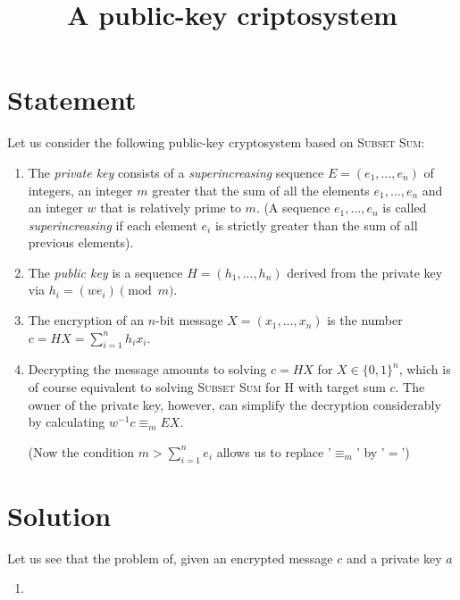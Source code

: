 \documentclass[a4paper]{article}
\title{A public-key criptosystem}
\begin{document}
\maketitle
\section*{Statement}
Let us consider the following public-key cryptosystem based on \textsc{Subset Sum}:

\begin{enumerate}[label=\alph*)]
	\item The \emph{private key} consists of a \emph{superincreasing} sequence $E = (e_1, ..., e_n)$ of integers, an integer $m$ greater that the sum of all the elements $e_1, ..., e_n$ and an integer $w$ that is relatively prime to $m$. (A sequence $e_1, ..., e_n$ is called \emph{superincreasing} if each element $e_i$ is strictly greater than the sum of all previous elements).
	\item The \emph{public key} is a sequence $H = (h_1, ..., h_n)$ derived from the private key via $h_i = (we_i) \pmod{m}$.
	\item The encryption of an $n$-bit message $X = (x_1, ..., x_n)$ is the number $c = HX = \sum_{i=1}^n h_ix_i$.
	\item Decrypting the message amounts to solving $c = HX$ for $X \in \{0, 1\}^n$, which is of course equivalent to solving \textsc{Subset Sum} for H with target sum $c$. The owner of the private key, however, can simplify the decryption considerably by calculating $w^{-1}c \equiv_m EX$.
	
	(Now the condition $m > \sum_{i=1}^n e_i$ allows us to replace '$\equiv_m$' by '$=$')
\end{enumerate}

\section*{Solution}
Let us see that the problem of, given an encrypted message $c$ and a private key $ a$
\begin{enumerate}[label=\roman*)]
	\item 
\end{enumerate}
\end{document}
